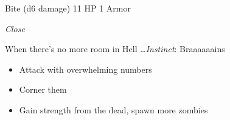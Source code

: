 \HRule
{}

Bite (d6 damage)\hspace*{\fill} 11 HP 1 Armor

\emph{Close}

\HRule
When there's no more room in Hell \ldots  \emph{Instinct}: Braaaaaains
\begin{itemize}
\item Attack with overwhelming numbers
\item Corner them
\item Gain strength from the dead, spawn more zombies
\end{itemize}

